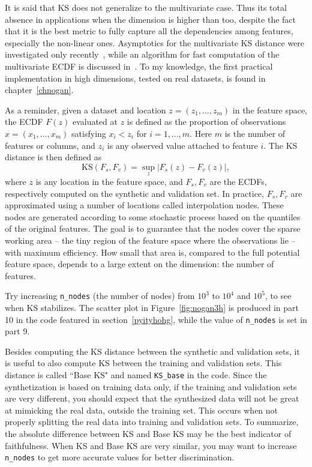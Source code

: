 \documentclass[oneside,10pt]{book}
\begin{document}
It is said that KS does not generalize to the multivariate case. Thus its
 total absence in applications when the dimension is higher than too, despite the fact that it is the best metric to fully capture all
the dependencies among features, especially the non-linear ones.
 Asymptotics for the multivariate KS distance were investigated only recently~\cite{gtepouc21}, while an algorithm
 for fast computation of the multivariate ECDF is discussed in~\cite{putrider22}. To my knowledge,
 the first practical implementation in high dimensions, tested on real datasets, is found in chapter~\ref{chnogan}.


As a reminder, given a dataset and location $z = (z_1,\dots, z_m)$ in the feature space, the ECDF $F(z)$ evaluated at $z$ is defined as
 the proportion of observations $x = (x_1,\dots,x_m)$
 satisfying $x_i < z_i$ for $i=1,\dots,m$. Here $m$ is the number of features or columns, and $z_i$ is any observed value attached to
 feature $i$. The KS distance is then defined as
$$
\text{KS}(F_s, F_v) = \sup_{z} |F_s(z) - F_v(z)|,
$$
where $z$ is any location in the feature space, and $F_s, F_v$ are the ECDFs, respectively computed on the synthetic and validation set.
In practice, $F_s,F_v$ are approximated using a number of locations called \textcolor{index}{interpolation nodes}.
 These nodes are generated according to some stochastic process based on the quantiles of the original features. The goal is to guarantee
 that the nodes cover the sparse working area -- the tiny region of the feature space where the observations lie  -- with maximum efficiency.
 How small that area is, compared to the full potential feature space, depends to a large extent on the dimension: the number of features.



Try increasing \texttt{n\_nodes} (the number of nodes) from $10^3$ to $10^4$ and $10^5$, to see when KS stabilizes.  The scatter plot
 in Figure~\ref{fig:nogan3h} is produced
 in part 10 in the code featured in section~\ref{pyityhohg}, while the value of \texttt{n\_nodes} is set in part 9.

Besides computing the KS distance between the synthetic and validation sets, it is useful to also compute KS between the training and validation sets. This distance is called ``Base KS" and named \texttt{KS\_base} in the code. Since the synthetization is based on training data only, if the training and validation sets are very different, you should expect that the synthesized data will not be great at mimicking the real data, outside the training set.
 This occurs when not properly splitting the real data into training and validation sets. To summarize, the absolute difference between
 KS and Base KS may be the best indicator of faithfulness. When KS and Base KS are very similar, you may want to increase \texttt{n\_nodes} to
 get more accurate values for better discrimination.
\end{document}
